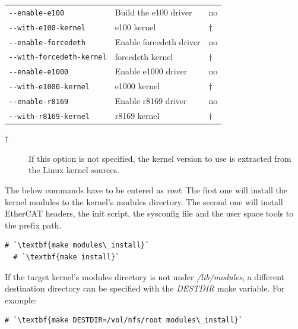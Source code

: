 \documentclass[a4paper,12pt,BCOR6mm,bibtotoc,idxtotoc]{scrbook}
\begin{document}
\begin{table}
\begin{tabular}{l|p{}|l}
\lstinline+--enable-e100+ & Build the e100 driver & no\\

\lstinline+--with-e100-kernel+ & e100 kernel & $\dagger$\\

\lstinline+--enable-forcedeth+ & Enable forcedeth driver & no\\

\lstinline+--with-forcedeth-kernel+ & forcedeth kernel & $\dagger$\\

\lstinline+--enable-e1000+ & Enable e1000 driver & no\\

\lstinline+--with-e1000-kernel+ & e1000 kernel & $\dagger$\\

\lstinline+--enable-r8169+ & Enable r8169 driver & no\\

\lstinline+--with-r8169-kernel+ & r8169 kernel & $\dagger$\\

  \end{tabular}
  \vspace{2mm}

\begin{description}

\item[$\dagger$] If this option is not specified, the kernel version to use is
extracted from the Linux kernel sources.

\end{description}

\end{table}

The below commands have to be entered as \textit{root}: The first one
will install the kernel modules to the kernel's modules directory. The
second one will install EtherCAT headers, the init script, the
sysconfig file and the user space tools to the prefix path.

\begin{lstlisting}[gobble=2]
  # `\textbf{make modules\_install}`
  # `\textbf{make install}`
\end{lstlisting}

If the target kernel's modules directory is not under
\textit{/lib/modules}, a different destination directory can be
specified with the \textit{DESTDIR} make variable. For example:

\begin{lstlisting}[gobble=2]
  # `\textbf{make DESTDIR=/vol/nfs/root modules\_install}`
\end{lstlisting}
\end{document}
